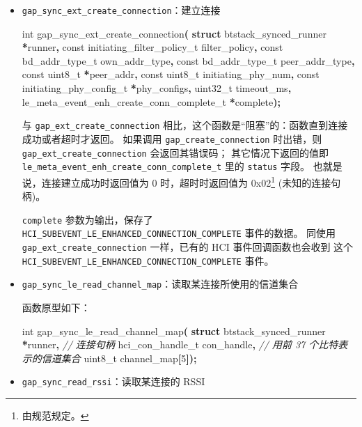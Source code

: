 \documentclass[
  12pt,
]{book}
\newenvironment{Shaded}{\begin{snugshade}}{\end{snugshade}}
\newcommand{\CommentTok}[1]{\textcolor[rgb]{0.56,0.35,0.01}{\textit{#1}}}
\newcommand{\DataTypeTok}[1]{\textcolor[rgb]{0.13,0.29,0.53}{#1}}
\newcommand{\DecValTok}[1]{\textcolor[rgb]{0.00,0.00,0.81}{#1}}
\newcommand{\KeywordTok}[1]{\textcolor[rgb]{0.13,0.29,0.53}{\textbf{#1}}}
\newcommand{\NormalTok}[1]{#1}
\newcommand{\OperatorTok}[1]{\textcolor[rgb]{0.81,0.36,0.00}{\textbf{#1}}}
\begin{document}
\begin{itemize}
\item
  \texttt{gap\_sync\_ext\_create\_connection}：建立连接

\begin{Shaded}
\begin{Highlighting}[]
\DataTypeTok{int}\NormalTok{ gap\_sync\_ext\_create\_connection}\OperatorTok{(}
    \KeywordTok{struct}\NormalTok{ btstack\_synced\_runner }\OperatorTok{*}\NormalTok{runner}\OperatorTok{,}
    \DataTypeTok{const}\NormalTok{ initiating\_filter\_policy\_t filter\_policy}\OperatorTok{,}
    \DataTypeTok{const}\NormalTok{ bd\_addr\_type\_t own\_addr\_type}\OperatorTok{,}
    \DataTypeTok{const}\NormalTok{ bd\_addr\_type\_t peer\_addr\_type}\OperatorTok{,}
    \DataTypeTok{const} \DataTypeTok{uint8\_t} \OperatorTok{*}\NormalTok{peer\_addr}\OperatorTok{,}
    \DataTypeTok{const} \DataTypeTok{uint8\_t}\NormalTok{ initiating\_phy\_num}\OperatorTok{,}
    \DataTypeTok{const}\NormalTok{ initiating\_phy\_config\_t }\OperatorTok{*}\NormalTok{phy\_configs}\OperatorTok{,}
    \DataTypeTok{uint32\_t}\NormalTok{ timeout\_ms}\OperatorTok{,}
\NormalTok{    le\_meta\_event\_enh\_create\_conn\_complete\_t }\OperatorTok{*}\NormalTok{complete}\OperatorTok{);}
\end{Highlighting}
\end{Shaded}

  与 \texttt{gap\_ext\_create\_connection} 相比，这个函数是``阻塞''的：函数直到连接成功或者超时才返回。
  如果调用 \texttt{gap\_create\_connection} 时出错，则 \texttt{gap\_ext\_create\_connection} 会返回其错误码；
  其它情况下返回的值即 \texttt{le\_meta\_event\_enh\_create\_conn\_complete\_t} 里的 \texttt{status} 字段。
  也就是说，连接建立成功时返回值为 0 时，超时时返回值为 0x02\footnote{由规范规定。} (未知的连接句柄)。

  \texttt{complete} 参数为输出，保存了\texttt{HCI\_SUBEVENT\_LE\_ENHANCED\_CONNECTION\_COMPLETE} 事件的数据。
  同使用 \texttt{gap\_ext\_create\_connection} 一样，已有的 HCI 事件回调函数也会收到
  这个 \texttt{HCI\_SUBEVENT\_LE\_ENHANCED\_CONNECTION\_COMPLETE} 事件。
\item
  \texttt{gap\_sync\_le\_read\_channel\_map}：读取某连接所使用的信道集合

  函数原型如下：

\begin{Shaded}
\begin{Highlighting}[]
\DataTypeTok{int}\NormalTok{ gap\_sync\_le\_read\_channel\_map}\OperatorTok{(}
  \KeywordTok{struct}\NormalTok{ btstack\_synced\_runner }\OperatorTok{*}\NormalTok{runner}\OperatorTok{,}
  \CommentTok{// 连接句柄}
\NormalTok{  hci\_con\_handle\_t con\_handle}\OperatorTok{,}
  \CommentTok{// 用前 37 个比特表示的信道集合}
  \DataTypeTok{uint8\_t}\NormalTok{ channel\_map}\OperatorTok{[}\DecValTok{5}\OperatorTok{]);}
\end{Highlighting}
\end{Shaded}
\item
  \texttt{gap\_sync\_read\_rssi}：读取某连接的 RSSI


\end{itemize}
\end{document}
